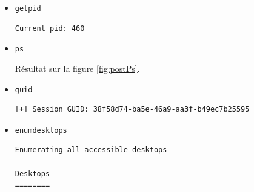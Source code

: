 \documentclass[a4paper]{article}
\begin{document}
\begin{itemize}
\begin{example}
\begin{Verbatim}[fontsize=\footnotesize]
Server username: NT AUTHORITY\SYSTEM
\end{Verbatim}
    \end{example}
    \item \texttt{\footnotesize getpid}
    \begin{example}
\begin{Verbatim}[fontsize=\footnotesize]
Current pid: 460
\end{Verbatim}
    \end{example}
    \item \texttt{\footnotesize ps}
    \begin{example}
        Résultat sur la figure \ref{fig:postPs}.
    \end{example}
    \item \texttt{\footnotesize guid}
    \begin{example}
\begin{Verbatim}[fontsize=\footnotesize]
[+] Session GUID: 38f58d74-ba5e-46a9-aa3f-b49ec7b25595
\end{Verbatim}
    \end{example}
    \item \texttt{\footnotesize enumdesktops}
    \begin{example}
\begin{Verbatim}[fontsize=\footnotesize]
Enumerating all accessible desktops

Desktops
========


\end{Verbatim}
\end{example}
\end{itemize}
\end{document}
